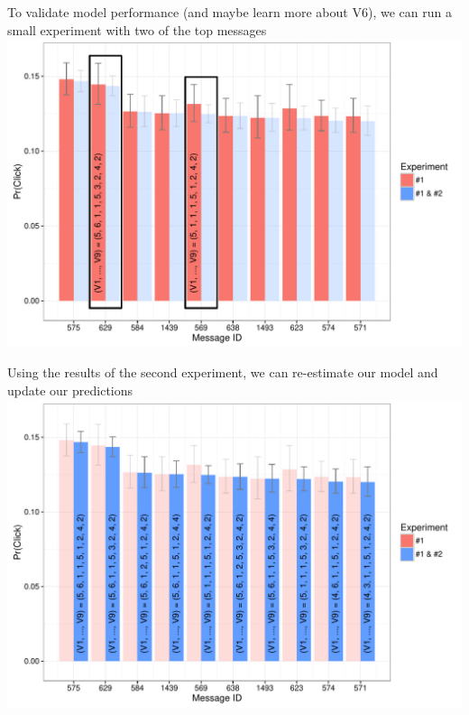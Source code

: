 \documentclass[11pt,xcolor=svgnames]{beamer}
\begin{document}
\begin{frame}
To validate model performance (and maybe learn more about V6), we can run a small experiment with two of the top messages
\includegraphics[width=\textwidth]{barplot2.pdf}
\end{frame}

\begin{frame}
Using the results of the second experiment, we can re-estimate our model and update our predictions
\includegraphics[width=\textwidth]{barplot3.pdf}
\end{frame}
\end{document}
